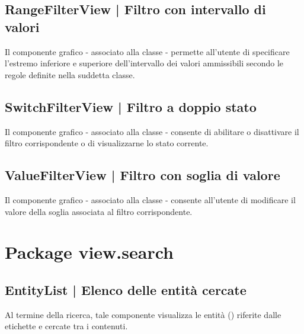 \documentclass[10pt,a4paper,headinclude,footinclude,hidelinks]{scrreprt} %
\begin{document}
	\subsection[RangeFilterView]{RangeFilterView | Filtro con intervallo di valori}
	\label{sec:stage:design:sistema:view.filter:range-filter}
	Il componente grafico - associato alla classe \textit{} - permette all'utente di specificare l'estremo inferiore e superiore dell'intervallo dei valori ammissibili secondo le regole definite nella suddetta classe.

	\subsection[SwitchFilterView]{SwitchFilterView | Filtro a doppio stato}
	\label{sec:stage:design:sistema:view.filter:switch-filter}
	Il componente grafico - associato alla classe \textit{} - consente di abilitare o disattivare il filtro corrispondente o di visualizzarne lo stato corrente.

	\subsection[ValueFilterView]{ValueFilterView | Filtro con soglia di valore}
	\label{sec:stage:design:sistema:view.filter:value-filter}
	Il componente grafico - associato alla classe \textit{} - consente all'utente di modificare il valore della soglia associata al filtro corrispondente.

	\section{Package view.search}
	\label{sec:stage:design:sistema:view.search}

	\subsection[EntityList]{EntityList | Elenco delle entità cercate}
	\label{sec:stage:design:sistema:view.search:search-entity-list}
	Al termine della ricerca, tale componente visualizza le entità (\textit{}) riferite dalle etichette e cercate tra i contenuti.
\end{document}
